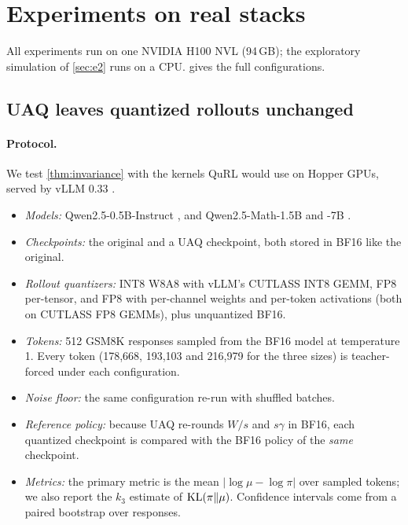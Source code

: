 \section{Experiments on real stacks}\label{sec:experiments}

All experiments run on one NVIDIA H100 NVL (94\,GB); the exploratory simulation of \cref{sec:e2} runs on a CPU.  gives the full configurations. 

\subsection{UAQ leaves quantized rollouts unchanged}\label{sec:s1}

\paragraph{Protocol.} We test \cref{thm:invariance} with the kernels QuRL would use on Hopper GPUs, served by vLLM 0.33 \citep{kwon2023vllm}.
\begin{itemize}[leftmargin=*,itemsep=1pt]
\item \emph{Models:} Qwen2.5-0.5B-Instruct \citep{qwen2024qwen25}, and Qwen2.5-Math-1.5B and -7B \citep{yang2024qwen25math}.
\item \emph{Checkpoints:} the original and a UAQ checkpoint, both stored in BF16 like the original.
\item \emph{Rollout quantizers:} INT8 W8A8 with vLLM's CUTLASS INT8 GEMM, FP8 per-tensor, and FP8 with per-channel weights and per-token activations (both on CUTLASS FP8 GEMMs), plus unquantized BF16.
\item \emph{Tokens:} 512 GSM8K \citep{cobbe2021gsm8k} responses sampled from the BF16 model at temperature 1. Every token (178{,}668, 193{,}103 and 216{,}979 for the three sizes) is teacher-forced under each configuration.
\item \emph{Noise floor:} the same configuration re-run with shuffled batches.
\item \emph{Reference policy:} because UAQ re-rounds $W/s$ and $s\gamma$ in BF16, each quantized checkpoint is compared with the BF16 policy of the \emph{same} checkpoint.
\item \emph{Metrics:} the primary metric is the mean $|\log\mu-\log\pi|$ over sampled tokens; we also report the $k_3$ estimate of $\mathrm{KL}(\pi\|\mu)$. Confidence intervals come from a paired bootstrap over responses.
\end{itemize}

